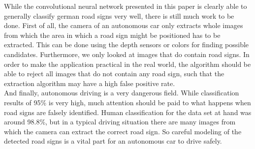 \documentclass[11pt,a4paper]{article}
\begin{document}
While the convolutional neural network presented in this paper is clearly able to generally classify german road signs very well, there is still much work to be done. First of all, the camera of an autonomous car only extracts whole images from which the area in which a road sign might be positioned has to be extracted. This can be done using the depth sensors or colors for finding possible candidates. Furthermore, we only looked at images that do contain road signs. In order to make the application practical in the real world, the algorithm should be able to reject all images that do not contain any road sign, such that the extraction algorithm may have a high false positive rate.\\
And finally, autonomous driving is a very dangerous field. While classification results of 95\% is very high, much attention should be paid to what happens when road signs are falsely identified. Human classification for the data set at hand was around 98.8\%, but in a typical driving situation there are many images from which the camera can extract the correct road sign. So careful modeling of the detected road signs is a vital part for an autonomous car to drive safely.
\newpage


\end{document}
